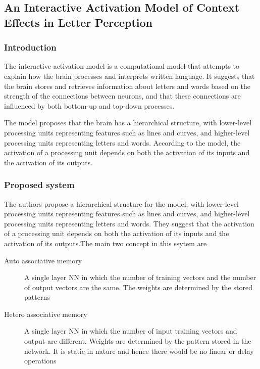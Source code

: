 \subsection{An Interactive Activation Model of Context Effects in Letter Perception}
\subsubsection{Introduction}
The interactive activation model\cite{auto} is a computational model that
attempts to explain how the brain processes and interprets written language. It
suggests that the brain stores and retrieves information about letters and
words based on the strength of the connections between neurons, and that these
connections are influenced by both bottom-up and top-down processes.

The model proposes that the brain has a hierarchical structure, with
lower-level processing units representing features such as lines and curves,
and higher-level processing units representing letters and words. According to
the model, the activation of a processing unit depends on both the activation
of its inputs and the activation of its outputs.
\subsubsection{Proposed system}
The authors propose a hierarchical structure for the model, with lower-level
processing units representing features such as lines and curves, and
higher-level processing units representing letters and words. They suggest that
the activation of a processing unit depends on both the activation of its
inputs and the activation of its outputs.The main two concept in this ssytem
are
\begin{description}
    \item[Auto associative memory]A single layer NN in which the number of training
    vectors and the number of output vectors are the same. The weights are
    determined by the stored patterns
    \item[Hetero associative memory]A single layer NN in which the number of input
    training vectors and output are different. Weights are determined by the
    pattern stored in the network. It is static in nature and hence there would be
    no linear or delay operations
\end{description}
